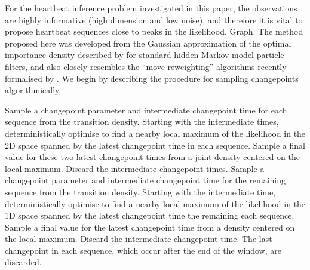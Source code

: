 \documentclass{article}
\begin{document}
For the heartbeat inference problem investigated in this paper, the observations are highly informative (high dimension and low noise), and therefore it is vital to propose heartbeat sequences close to peaks in the likelihood. {\meta Graph.} The method proposed here was developed from the Gaussian approximation of the optimal importance density described by \citet{Doucet2000a} for standard hidden Markov model particle filters, and also closely resembles the ``move-reweighting'' algorithms recently formalised by \citet{Marques2013}. We begin by describing the procedure for sampling changepoints algorithmically,
%
\begin{algorithmic}[1]
    \STATE Sample a changepoint parameter and intermediate changepoint time for each sequence from the transition density.
    \STATE Starting with the intermediate times, deterministically optimise to find a nearby local maximum of the likelihood in the 2D space spanned by the latest changepoint time in each sequence.
    \STATE Sample a final value for these two latest changepoint times from a joint density centered on the local maximum.
    \STATE Discard the intermediate changepoint times.
  \ENDWHILE
    \STATE Sample a changepoint parameter and intermediate changepoint time for the remaining sequence from the transition density.
    \STATE Starting with the intermediate time, deterministically optimise to find a nearby local maximum of the likelihood in the 1D space spanned by the latest changepoint time the remaining each sequence.
    \STATE Sample a final value for the latest changepoint time from a density centered on the local maximum.
    \STATE Discard the intermediate changepoint time.
  \ENDWHILE
  \STATE The last changepoint in each sequence, which occur after the end of the window, are discarded.
\end{algorithmic}
\end{document}
